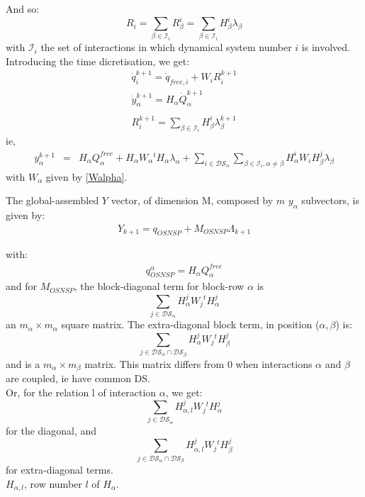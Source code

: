 \documentclass[10pt]{report}
\begin{document}
And so: 
\begin{equation}
R_i = \sum_{\beta\in\mathcal{I}_i}R_{\beta}^i=\sum_{\beta\in\mathcal{I}_i}{}H^i_{\beta} \lambda_{\beta}
\end{equation}
with $\mathcal{I}_i$ the set of interactions in which dynamical system number $i$ is involved. \\
Introducing the time dicretisation, we get: 
\begin{eqnarray}
\dot q_i^{k+1} = \dot q_{free,i} + W_iR_i^{k+1}
\nonumber\\
\dot y_{\alpha}^{k+1} = H_{\alpha}\dot Q_{\alpha}^{k+1} \\
\nonumber\\
R_i^{k+1} = \sum_{\beta\in\mathcal{I}_i}H^i_{\beta} \lambda_{\beta}^{k+1}
\end{eqnarray}
ie, 
\begin{eqnarray}
  y_{\alpha}^{k+1} &=& H_{\alpha} Q_{\alpha}^{free} + H_{\alpha}W_{\alpha}{}^tH_{\alpha}\lambda_{\alpha}+\sum_{i\in \mathcal{DS}_{\alpha}}\sum_{\beta\in\mathcal{I}_i,\alpha\neq\beta}H_{\alpha}^iW_iH_{\beta}^j\lambda_{\beta}
\end{eqnarray}
with $W_{\alpha}$ given by \eqref{Walpha}. 

The global-assembled $Y$ vector, of dimension M, composed by $m$ $y_{\alpha}$ subvectors, is given by:
\begin{eqnarray}
Y_{k+1} = q_{OSNSP} + M_{OSNSP}\Lambda_{k+1}
\end{eqnarray}

with:
\begin{eqnarray}
q_{OSNSP}^{\alpha} = H_{\alpha} Q_{\alpha}^{free}
\end{eqnarray}
and for $M_{OSNSP}$, the block-diagonal term for block-row $\alpha$ is
\begin{equation}
\sum_{j\in \mathcal{DS}_{\alpha}}H_{\alpha}^jW_j{}^tH_{\alpha}^j
\end{equation}
an $m_{\alpha}\times m_{\alpha}$ square matrix.
The extra-diagonal block term, in position ($\alpha,\beta$) is: 
\begin{equation}
\sum_{j\in \mathcal{DS}_{\alpha}\cap\mathcal{DS}_{\beta}}H_{\alpha}^jW_j{}^tH_{\beta}^j
\end{equation}
and is a $m_{\alpha}\times m_{\beta}$ matrix. This matrix differs from 0 when interactions $\alpha$ and $\beta$ are coupled, ie have common DS. \\

Or, for the relation l of interaction $\alpha$, we get: 
\begin{equation}
\sum_{j\in \mathcal{DS}_{\alpha}}H_{\alpha,l}^jW_j{}^tH_{\alpha}^j
\end{equation}
for the diagonal, and 
\begin{equation}
\sum_{j\in \mathcal{DS}_{\alpha}\cap\mathcal{DS}_{\beta}}H_{\alpha,l}^jW_j{}^tH_{\beta}^j
\end{equation}
for extra-diagonal terms. \\
$H_{\alpha,l}$, row number $l$ of $H_{\alpha}$.
\end{document}
